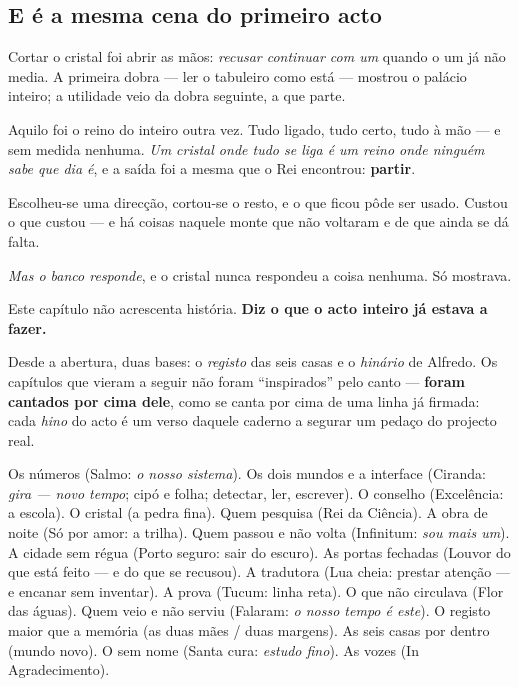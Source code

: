 \documentclass[livro.tex]{subfiles}
\begin{document}
\subsection*{E é a mesma cena do primeiro acto}

Cortar o cristal foi abrir as mãos: \emph{recusar continuar com um} quando o um já não media.
A primeira dobra --- ler o tabuleiro como está --- mostrou o palácio inteiro; a utilidade veio da
dobra seguinte, a que parte.

\medskip

Aquilo foi o reino do inteiro outra vez. Tudo ligado, tudo certo, tudo à mão --- e sem medida
nenhuma. \emph{Um cristal onde tudo se liga é um reino onde ninguém sabe que dia é}, e a saída
foi a mesma que o Rei encontrou: \textbf{partir}.

\medskip

Escolheu-se uma direcção, cortou-se o resto, e o que ficou pôde ser usado. Custou o que custou ---
e há coisas naquele monte que não voltaram e de que ainda se dá falta.

\medskip

\emph{Mas o banco responde}, e o cristal nunca respondeu a coisa nenhuma. Só mostrava.

Este capítulo não acrescenta história. \textbf{Diz o que o acto inteiro já estava a fazer.}

\medskip

Desde a abertura, duas bases: o \emph{registo} das seis casas e o \emph{hinário} de Alfredo.
Os capítulos que vieram a seguir não foram ``inspirados'' pelo canto --- \textbf{foram
cantados por cima dele}, como se canta por cima de uma linha já firmada: cada \emph{hino} do
acto é um verso daquele caderno a segurar um pedaço do projecto real.

\medskip

Os números (Salmo: \emph{o nosso sistema}). Os dois mundos e a interface (Ciranda: \emph{gira
--- novo tempo}; cipó e folha; detectar, ler, escrever). O conselho (Excelência: a escola). O
cristal (a pedra fina). Quem pesquisa (Rei da Ciência). A obra de noite (Só por amor: a
trilha). Quem passou e não volta (Infinitum: \emph{sou mais um}). A cidade sem régua (Porto
seguro: sair do escuro). As portas fechadas (Louvor do que está feito --- e do que se
recusou). A tradutora (Lua cheia: prestar atenção --- e encanar sem inventar). A prova
(Tucum: linha reta). O que não circulava (Flor das águas). Quem veio e não serviu
(Falaram: \emph{o nosso tempo é este}). O registo maior que a memória (as duas mães / duas
margens). As seis casas por dentro (mundo novo). O sem nome (Santa cura: \emph{estudo fino}).
As vozes (In Agradecimento).
\end{document}
